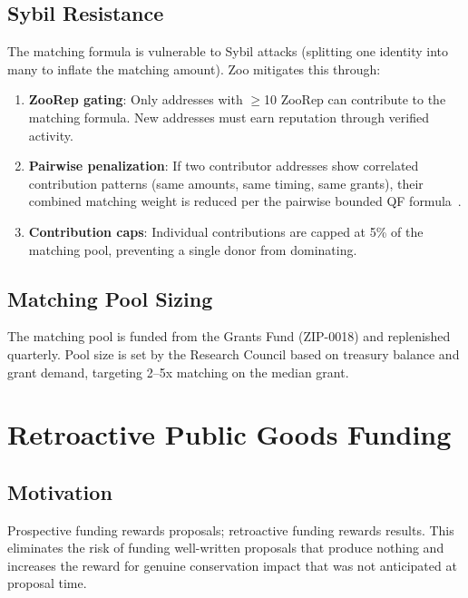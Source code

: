 \documentclass[11pt,letterpaper]{article}
\begin{document}
\subsection{Sybil Resistance}

The matching formula is vulnerable to Sybil attacks (splitting one identity into many to inflate the matching amount). Zoo mitigates this through:

\begin{enumerate}
    \item \textbf{ZooRep gating}: Only addresses with $\geq$10 ZooRep can contribute to the matching formula. New addresses must earn reputation through verified activity.
    \item \textbf{Pairwise penalization}: If two contributor addresses show correlated contribution patterns (same amounts, same timing, same grants), their combined matching weight is reduced per the pairwise bounded QF formula~\cite{buterin2019flexible}.
    \item \textbf{Contribution caps}: Individual contributions are capped at 5\% of the matching pool, preventing a single donor from dominating.
\end{enumerate}

\subsection{Matching Pool Sizing}

The matching pool is funded from the Grants Fund (ZIP-0018) and replenished quarterly. Pool size is set by the Research Council based on treasury balance and grant demand, targeting 2--5x matching on the median grant.

\section{Retroactive Public Goods Funding}
\label{sec:retro}

\subsection{Motivation}

Prospective funding rewards proposals; retroactive funding rewards results. This eliminates the risk of funding well-written proposals that produce nothing and increases the reward for genuine conservation impact that was not anticipated at proposal time.
\end{document}
